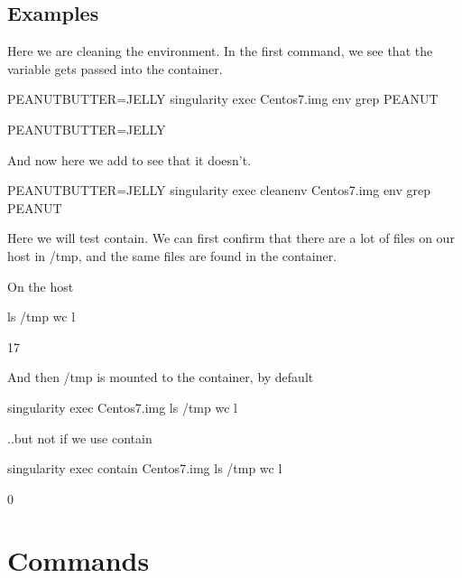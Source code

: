 \documentclass[letterpaper,10pt,english]{sphinxmanual}
\begin{document}
\subsection{Examples}
\label{\detokenize{appendix:examples}}
Here we are cleaning the environment. In the first command, we see that the variable  gets passed into the container.

%
\begin{sphinxVerbatim}[commandchars=\\\{\}]
PEANUTBUTTER=JELLY singularity exec Centos7.img env \textbar{} grep PEANUT

PEANUTBUTTER=JELLY
\end{sphinxVerbatim}

And now here we add  to see that it doesn’t.

%
\begin{sphinxVerbatim}[commandchars=\\\{\}]
PEANUTBUTTER=JELLY singularity exec \PYGZhy{}\PYGZhy{}cleanenv Centos7.img env \textbar{} grep PEANUT
\end{sphinxVerbatim}

Here we will test contain. We can first confirm that there are a lot of files on our host in /tmp, and the same files are found in the container.

%
\begin{sphinxVerbatim}[commandchars=\\\{\}]
\PYGZsh{} On the host

\PYGZdl{} ls /tmp \textbar{} wc \PYGZhy{}l

17


\PYGZsh{} And then /tmp is mounted to the container, by default

\PYGZdl{} singularity exec Centos7.img  ls /tmp \textbar{} wc \PYGZhy{}l


\PYGZsh{} ..but not if we use \PYGZhy{}\PYGZhy{}contain

\PYGZdl{} singularity exec \PYGZhy{}\PYGZhy{}contain Centos7.img  ls /tmp \textbar{} wc \PYGZhy{}l

0
\end{sphinxVerbatim}


\section{Commands}
\label{\detokenize{appendix:commands}}
\end{document}
